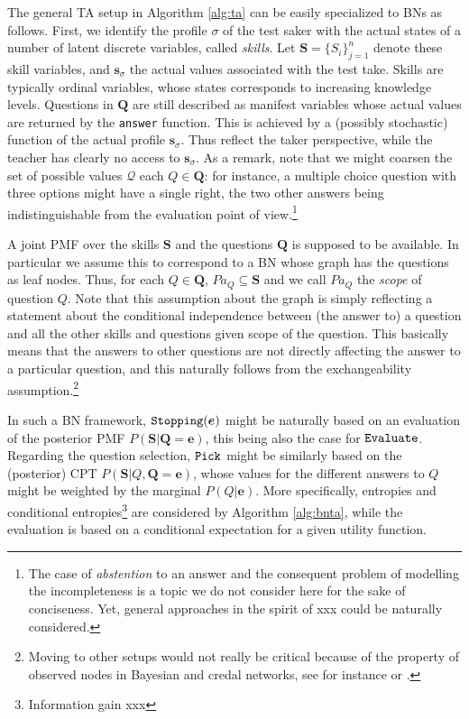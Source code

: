 \documentclass[runningheads]{llncs}
\begin{document}
The general TA setup in Algorithm \ref{alg:ta} can be easily specialized to BNs as follows.
First, we identify the profile $\sigma$ of the test saker with the actual states of a number of latent discrete variables, called \emph{skills}. Let $\bm{S}=\{S_i\}_{j=1}^n$ denote these skill variables, and $\bm{s}_\sigma$ the actual values associated with the test take. Skills are typically ordinal variables, whose states corresponds to increasing knowledge levels. Questions in $\bm{Q}$ are still described as manifest variables whose actual values are returned by the {\tt answer} function. This is achieved by a (possibly stochastic) function of the actual profile $\bm{s}_\sigma$. Thus reflect the taker perspective, while the teacher has clearly no access to $\bm{s}_\sigma$. As a remark, note that we might coarsen the set of possible values $\mathcal{Q}$ each $Q\in \bm{Q}$: for instance, a multiple choice question with three options might have a single right, the two other answers being indistinguishable from the evaluation point of view.\footnote{The case of \emph{abstention} to an answer and the consequent problem of modelling the incompleteness is a topic we do not consider here for the sake of conciseness. Yet, general approaches in the spirit of xxx could be naturally considered.} 
 
A joint PMF over the skills $\bm{S}$ and the questions $\bm{Q}$ is supposed to be available. In particular we assume this to correspond to a BN whose graph has the questions as leaf nodes. Thus, for each $Q\in\bm{Q}$, $Pa_Q \subseteq \bm{S}$ and we call $Pa_Q$ the \emph{scope} of question $Q$. Note that this assumption about the graph is simply reflecting a statement about the conditional independence between (the answer to) a question and all the other skills and questions given scope of the question. This basically means that the answers to other questions are not directly affecting the answer to a particular question, and this naturally follows from the exchangeability assumption.\footnote{Moving to other setups would not really be critical because of the property of observed nodes in Bayesian and credal networks, see for instance \cite{antonucci2009} or \cite{debock,bolt}.}

In such a BN framework, ${\tt Stopping}(\bm{e})$ might be naturally based on an evaluation of the posterior PMF $P(\bm{S}|\bm{Q}=\bm{e})$, this being also the case for ${\tt Evaluate}$. Regarding the question selection, ${\tt Pick}$ might be similarly based on the (posterior) CPT $P(\bm{S}|Q,\bm{Q}=\bm{e})$, whose values for the different answers to $Q$ might be weighted by the marginal $P(Q|\bm{e})$. More specifically, entropies and conditional entropies\footnote{Information gain xxx} are considered by Algorithm \ref{alg:bnta}, while the evaluation is based on a conditional expectation for a given utility function.
\end{document}
